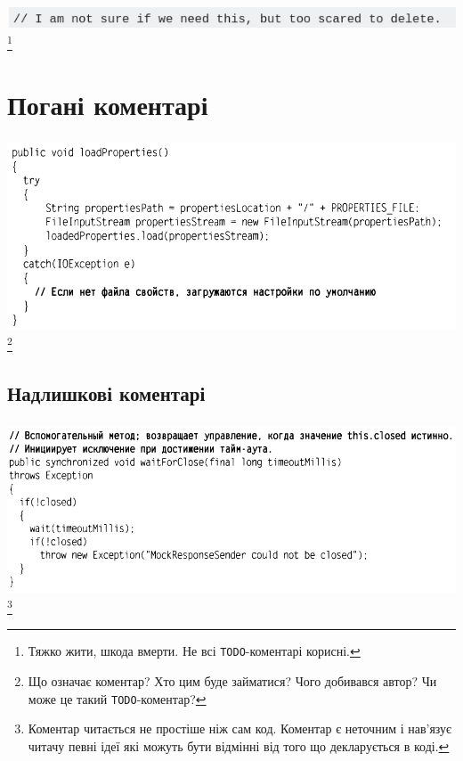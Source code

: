 \documentclass[12pt,pdf,utf8,ukrainian,aspectratio=169]{beamer}
\makeatletter
\newcommand*{\currentname}{\@currentlabelname}
\makeatother
\begin{document}
	\begin{frame}\frametitle{\currentname}
		\includegraphics[scale=0.65]{Comment_06.png}
		\footnote{Тяжко жити, шкода вмерти. Не всі \texttt{TODO}-коментарі корисні.}
		\hfill
	\end{frame}

	\section{Погані коментарі}
	\begin{frame}\frametitle{\currentname}
		\includegraphics[scale=0.5]{clean_code_9.png}
		\footnote{Що означає коментар? Хто цим буде займатися? Чого добивався автор? Чи може це такий \texttt{TODO}-коментар?}
		\hfill
	\end{frame}	
	
	\subsection{Надлишкові коментарі}
	\begin{frame}[label={slideError}]\frametitle{\currentname}
		\includegraphics[scale=0.5]{clean_code_10.png}
		\footnote{Коментар читається не простіше ніж сам код. Коментар є неточним і нав'язує читачу певні ідеї які можуть бути відмінні від того що декларується в коді.}
		\hfill
	\end{frame}	
\end{document}
